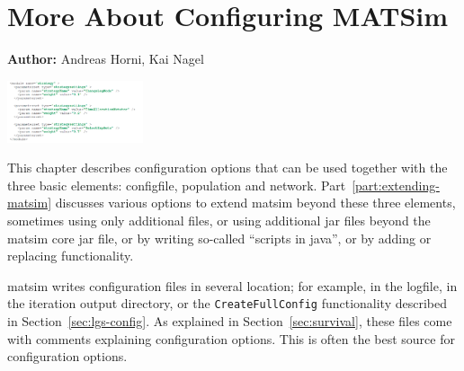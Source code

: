 \chapter{More About Configuring MATSim}
\label{ch:configuring}

\hfill \textbf{Author:} Andreas Horni, Kai Nagel

\begin{center} \includegraphics[width=0.3\textwidth, angle=0]{using/figures/strategy.png} \end{center}


This chapter describes configuration options that can be used together with the three basic elements: \gls{configfile}, population and network.
%
Part~\ref{part:extending-matsim} discusses various options to extend \gls{matsim} beyond these three elements, sometimes using only additional files, or using additional \gls{jar} files beyond the \gls{matsim} core \gls{jar} file, or by writing so-called ``scripts in \gls{java}'', or by adding or replacing functionality.

\gls{matsim} writes configuration files in several location; for example, in the logfile, in the iteration output directory, or the \lstinline{CreateFullConfig} functionality described in Section~\ref{sec:lgs-config}.  As explained in Section~\ref{sec:survival}, these files come with comments explaining configuration options.  This is often the best source for configuration options.  %

